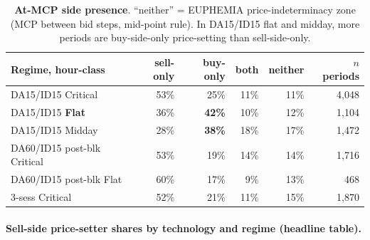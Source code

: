 \documentclass[11pt,a4paper]{article}
\begin{document}
\begin{table}[H]
\centering\scriptsize
\setlength{\tabcolsep}{4pt}
\begin{tabular}{l r r r r r}
\toprule
Regime, hour-class & sell-only & buy-only & both & neither & $n$ periods \\
\midrule
DA15/ID15 Critical          & 53\% & 25\% & 11\% & 11\% & 4{,}048 \\
DA15/ID15 \textbf{Flat}     & 36\% & \textbf{42\%} & 10\% & 12\% & 1{,}104 \\
DA15/ID15 Midday            & 28\% & \textbf{38\%} & 18\% & 17\% & 1{,}472 \\
DA60/ID15 post-blk Critical & 53\% & 19\% & 14\% & 14\% & 1{,}716 \\
DA60/ID15 post-blk Flat     & 60\% & 17\% &  9\% & 13\% &   468 \\
3-sess Critical             & 52\% & 21\% & 11\% & 15\% & 1{,}870 \\
\bottomrule
\end{tabular}
\caption{\textbf{At-MCP side presence}. ``neither'' = EUPHEMIA price-indeterminacy zone (MCP between bid steps, mid-point rule). In DA15/ID15 flat and midday, more periods are buy-side-only price-setting than sell-side-only.}
\label{tab:side_composition}
\end{table}

\paragraph{Sell-side price-setter shares by technology and regime (headline table).}
\end{document}
